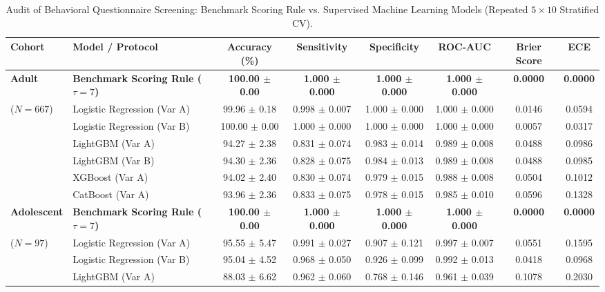 \begin{table}[t]
\centering
\caption{Audit of Behavioral Questionnaire Screening: Benchmark Scoring Rule vs. Supervised Machine Learning Models (Repeated $5 \times 10$ Stratified CV).}
\label{tab:questionnaire_audit}
\footnotesize
\setlength{\tabcolsep}{4pt}
\begin{tabular}{llcccccc}
\toprule
\textbf{Cohort} & \textbf{Model / Protocol} & \textbf{Accuracy (\%)} & \textbf{Sensitivity} & \textbf{Specificity} & \textbf{ROC-AUC} & \textbf{Brier Score} & \textbf{ECE} \\
\midrule
\textbf{Adult} & \textbf{Benchmark Scoring Rule ($\tau = 7$)} & \textbf{100.00 $\pm$ 0.00} & \textbf{1.000 $\pm$ 0.000} & \textbf{1.000 $\pm$ 0.000} & \textbf{1.000 $\pm$ 0.000} & \textbf{0.0000} & \textbf{0.0000} \\
($N = 667$) & Logistic Regression (Var A) & 99.96 $\pm$ 0.18 & 0.998 $\pm$ 0.007 & 1.000 $\pm$ 0.000 & 1.000 $\pm$ 0.000 & 0.0146 & 0.0594 \\
 & Logistic Regression (Var B) & 100.00 $\pm$ 0.00 & 1.000 $\pm$ 0.000 & 1.000 $\pm$ 0.000 & 1.000 $\pm$ 0.000 & 0.0057 & 0.0317 \\
 & LightGBM (Var A) & 94.27 $\pm$ 2.38 & 0.831 $\pm$ 0.074 & 0.983 $\pm$ 0.014 & 0.989 $\pm$ 0.008 & 0.0488 & 0.0986 \\
 & LightGBM (Var B) & 94.30 $\pm$ 2.36 & 0.828 $\pm$ 0.075 & 0.984 $\pm$ 0.013 & 0.989 $\pm$ 0.008 & 0.0488 & 0.0985 \\
 & XGBoost (Var A) & 94.02 $\pm$ 2.40 & 0.830 $\pm$ 0.074 & 0.979 $\pm$ 0.015 & 0.988 $\pm$ 0.008 & 0.0504 & 0.1012 \\
 & CatBoost (Var A) & 93.96 $\pm$ 2.36 & 0.833 $\pm$ 0.075 & 0.978 $\pm$ 0.015 & 0.985 $\pm$ 0.010 & 0.0596 & 0.1328 \\
\midrule
\textbf{Adolescent} & \textbf{Benchmark Scoring Rule ($\tau = 7$)} & \textbf{100.00 $\pm$ 0.00} & \textbf{1.000 $\pm$ 0.000} & \textbf{1.000 $\pm$ 0.000} & \textbf{1.000 $\pm$ 0.000} & \textbf{0.0000} & \textbf{0.0000} \\
($N = 97$) & Logistic Regression (Var A) & 95.55 $\pm$ 5.47 & 0.991 $\pm$ 0.027 & 0.907 $\pm$ 0.121 & 0.997 $\pm$ 0.007 & 0.0551 & 0.1595 \\
 & Logistic Regression (Var B) & 95.04 $\pm$ 4.52 & 0.968 $\pm$ 0.050 & 0.926 $\pm$ 0.099 & 0.992 $\pm$ 0.013 & 0.0418 & 0.0968 \\
 & LightGBM (Var A) & 88.03 $\pm$ 6.62 & 0.962 $\pm$ 0.060 & 0.768 $\pm$ 0.146 & 0.961 $\pm$ 0.039 & 0.1078 & 0.2030 \\

\end{tabular}
\end{table}

